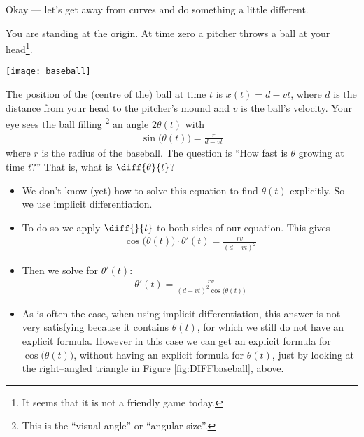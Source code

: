 Okay --- let's get away from curves and do something a little different.

\begin{eg}\label{eg:DIFFimpldiffC}
You are standing at the origin. At time zero a pitcher throws a ball at
your head\footnote{It seems that it is not a friendly game today.}.
\begin{sfig}\label{fig:DIFFbaseball}
\begin{center}
  \texttt{[image: baseball]}
\end{center}
\end{sfig}
The position of the (centre of the) ball at time $t$ is $x(t)=d-vt$, where $d$ is
the distance from your head to the  pitcher's mound and $v$ is the ball's
velocity. Your eye sees the ball filling \footnote{This is the ``visual angle''
or ``angular size''.} an angle $2\theta(t)$ with
\begin{align*}\label{eq:DIFFbaseball}
\sin\big(\theta(t)\big)=\frac{r}{d-vt}
\end{align*}
where $r$ is the radius of the baseball. The question is ``How fast is
$\theta$ growing at time $t$?'' That is, what is $\diff{\theta}{t}$?

\begin{itemize}
 \item We don't know (yet) how to solve this equation to find
$\theta(t)$ explicitly. So we use implicit differentiation.

\item To do so we apply $\diff{}{t}$ to both sides of
our equation. This gives
\begin{align*}
\cos\big(\theta(t)\big)\cdot\theta'(t)=\frac{rv}{(d-vt)^2}
\end{align*}
\item Then we solve for $\theta'(t)$:
\begin{align*}
\theta'(t)=\frac{rv}{(d-vt)^2\cos\big(\theta(t)\big)}
\end{align*}
\item As is often the case, when using implicit differentiation, this answer
is not very satisfying because it contains $\theta(t)$, for which we still
do not have an explicit formula. However in this case we can get an
explicit formula for $\cos\big(\theta(t)\big)$, without having an explicit
formula for $\theta(t)$, just by looking at the right--angled triangle
in Figure \ref{fig:DIFFbaseball}, above.


\end{itemize}
\end{eg}
